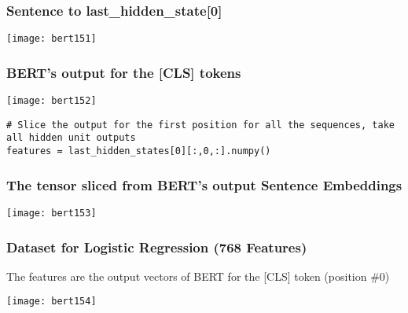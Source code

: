\begin{frame}[fragile]\frametitle{Sentence to last\_hidden\_state[0]}

			\begin{center}
			\texttt{[image: bert151]}
			\end{center}	


\end{frame}


\begin{frame}[fragile]\frametitle{BERT’s output for the [CLS] tokens}



			\begin{center}
			\texttt{[image: bert152]}
			\end{center}	

\begin{lstlisting}
# Slice the output for the first position for all the sequences, take all hidden unit outputs 
features = last_hidden_states[0][:,0,:].numpy()
\end{lstlisting}



\end{frame}


\begin{frame}[fragile]\frametitle{The tensor sliced from BERT's output Sentence Embeddings}


			\begin{center}
			\texttt{[image: bert153]}
			\end{center}	


\end{frame}

\begin{frame}[fragile]\frametitle{Dataset for Logistic Regression (768 Features)}

The features are the output vectors of BERT for the [CLS] token (position \#0)

			\begin{center}
			\texttt{[image: bert154]}
			\end{center}	


\end{frame}

